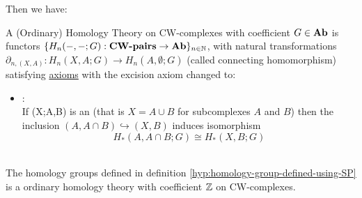     Then we have:
    \begin{defn}
        A (Ordinary) Homology Theory on  CW-complexes with coefficient $G \in \mathbf{Ab}$ is
        functors $\{H_n(-,-;G) : \textbf{CW-pairs} \to \mathbf{Ab}\}_{n \in \mathbb N}$,
        with natural transformations ${\partial_{n,(X,A)} : H_n(X,A;G) \to H_n(A,\emptyset;G)}$
        (called connecting homomorphism)\\
        satisfying \hyperref[hyp:Ordinary-Homology-Theory]{axioms}
        with the excision axiom changed to:
        \begin{itemize}
            \item {}:\\ 
                If (X;A,B) is an  (that is $X = A \cup B$ for subcomplexes $A$ and $B$)
                then the inclusion $(A,A \cap B) \hookrightarrow (X,B)$
                induces isomorphism
                $$
                H_*(A,A\cap B ; G) \cong H_*(X,B;G)
                $$\\
        \end{itemize}
    \end{defn}

    \begin{prop}
        The homology groups defined in definition \ref{hyp:homology-group-defined-using-SP}
        is a ordinary homology theory with coefficient $\mathbb Z$ on CW-complexes.
    \end{prop}

